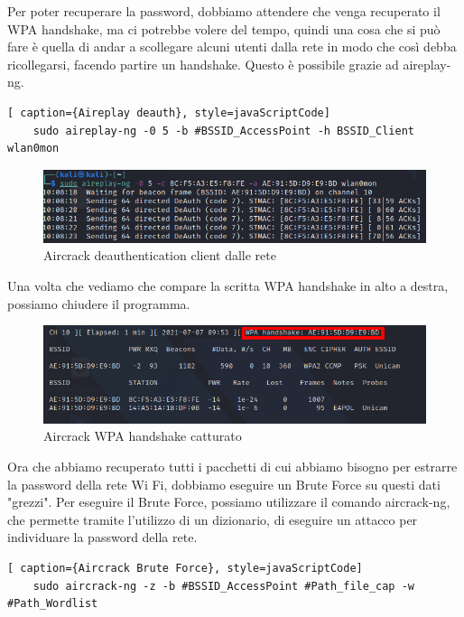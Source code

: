 Per poter recuperare la password, dobbiamo attendere che venga recuperato il WPA handshake, ma ci potrebbe volere del tempo, quindi una cosa che si può fare è quella di andar a scollegare alcuni utenti dalla rete in modo che così debba ricollegarsi, facendo partire un handshake. Questo è possibile grazie ad aireplay-ng.

\begin{lstlisting}[ caption={Aireplay deauth}, style=javaScriptCode]
	sudo aireplay-ng -0 5 -b #BSSID_AccessPoint -h BSSID_Client wlan0mon
\end{lstlisting}

\begin{figure}[ht]
    \centering
    \includegraphics[width=\linewidth]{Immagini/6/aircrack_7.png}
    \caption{Aircrack deauthentication client dalle rete}
    \label{fig:Aircrack esempio}
\end{figure}

Una volta che vediamo che compare la scritta WPA handshake in alto a destra, possiamo chiudere il programma.

\begin{figure}[ht]
    \centering
    \includegraphics[width=\linewidth]{Immagini/6/aircrack_5.png}
    \caption{Aircrack WPA handshake catturato}
    \label{fig:Aircrack esempio}
\end{figure}

Ora che abbiamo recuperato tutti i pacchetti di cui abbiamo bisogno per estrarre la password della rete Wi Fi, dobbiamo eseguire un Brute Force su questi dati "grezzi". Per eseguire il Brute Force, possiamo utilizzare il comando aircrack-ng, che permette tramite l'utilizzo di un dizionario, di eseguire un attacco per individuare la password della rete.

\begin{lstlisting}[ caption={Aircrack Brute Force}, style=javaScriptCode]
    sudo aircrack-ng -z -b #BSSID_AccessPoint #Path_file_cap -w #Path_Wordlist
\end{lstlisting}

